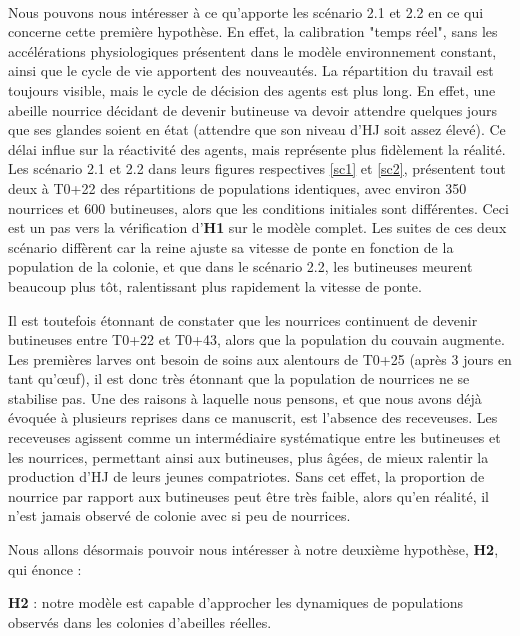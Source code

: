 		\paragraph{}
		Nous pouvons nous intéresser à ce qu'apporte les scénario 2.1 et 2.2 en ce qui concerne cette première hypothèse. En effet, la calibration "temps réel", sans les accélérations physiologiques présentent dans le modèle environnement constant, ainsi que le cycle de vie apportent des nouveautés. La répartition du travail est toujours visible, mais le cycle de décision des agents est plus long. En effet, une abeille nourrice décidant de devenir butineuse va devoir attendre quelques jours que ses glandes soient en état (attendre que son niveau d'HJ soit assez élevé). Ce délai influe sur la réactivité des agents, mais représente plus fidèlement la réalité. Les scénario 2.1 et 2.2 dans leurs figures respectives \ref{sc1} et \ref{sc2}, présentent tout deux à T0+22 des répartitions de populations identiques, avec environ 350 nourrices et 600 butineuses, alors que les conditions initiales sont différentes. Ceci est un pas vers la vérification d'\textbf{H1} sur le modèle complet. Les suites de ces deux scénario diffèrent car la reine ajuste sa vitesse de ponte en fonction de la population de la colonie, et que dans le scénario 2.2, les butineuses meurent beaucoup plus tôt, ralentissant plus rapidement la vitesse de ponte.
		
		Il est toutefois étonnant de constater que les nourrices continuent de devenir butineuses entre T0+22 et T0+43, alors que la population du couvain augmente. Les premières larves ont besoin de soins aux alentours de T0+25 (après 3 jours en tant qu'œuf), il est donc très étonnant que la population de nourrices ne se stabilise pas. Une des raisons à laquelle nous pensons, et que nous avons déjà évoquée à plusieurs reprises dans ce manuscrit, est l'absence des receveuses. Les receveuses agissent comme un intermédiaire systématique entre les butineuses et les nourrices, permettant ainsi aux butineuses, plus âgées, de mieux ralentir la production d'HJ de leurs jeunes compatriotes. Sans cet effet, la proportion de nourrice par rapport aux butineuses peut être très faible, alors qu'en réalité, il n'est jamais observé de colonie avec si peu de nourrices.
		

		Nous allons désormais pouvoir nous intéresser à notre deuxième hypothèse, \textbf{H2}, qui énonce : 
		
		 \textbf{H2} : notre modèle est capable d'approcher les dynamiques de populations observés dans les colonies d'abeilles réelles.
		 
